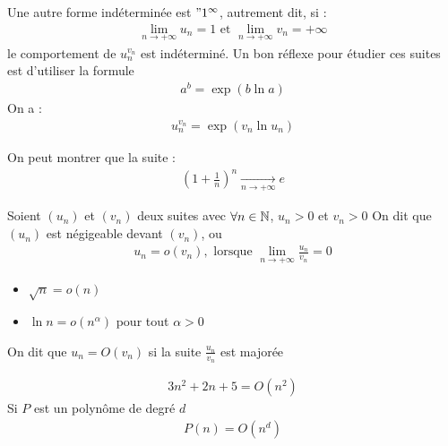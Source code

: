 \begin{remarque}
    Une autre forme indéterminée est $"1^{\infty}$, autrement dit, si :
    \begin{align*}
        \lim_{n \to +\infty} u_n = 1 \text{ et } \lim_{n \to +\infty} v_n = +\infty
    \end{align*}
    le comportement de $u_n^{v_n}$ est indéterminé. Un bon réflexe pour étudier ces suites est d'utiliser la formule 
    \begin{align*}
        a^b = \exp(b\ln a)
    \end{align*}
    On a :
    \begin{align*}
        u_n^{v_n} = \exp(v_n \ln u_n)
    \end{align*}
\end{remarque}

\begin{exemple}
On peut montrer que la suite :
\begin{align*} 
    \left(1 + \frac{1}{n}\right)^n \xrightarrow[n \to +\infty]{} e
\end{align*}
\end{exemple}

\begin{remarque}
Soient $(u_n)$ et $(v_n)$ deux suites avec $\forall n \in \mathbb{N}$, $u_n > 0$ et $v_n > 0$ On dit que $(u_n)$ est négigeable devant $(v_n)$, ou 
\begin{align*}
    u_n = o(v_n), \text{ lorsque } \lim_{n \to +\infty} \frac{u_n}{v_n} = 0
\end{align*}
\end{remarque}

\begin{exemple}
    \begin{itemize}
        \item $\sqrt{n} = o(n)$
        \item $\ln n = o(n^{\alpha})$ pour tout $\alpha > 0$
    \end{itemize}
\end{exemple}

\begin{remarque}
On dit que $u_n = O(v_n)$ si la suite $\frac{u_n}{v_n}$ est majorée
\end{remarque}

\begin{exemple}
    \begin{align*}
        3n^2 + 2n + 5 = O(n^2)
    \end{align*}
    Si $P$ est un polynôme de degré $d$
    \begin{align*}
        P(n) = O(n^d)
    \end{align*}
\end{exemple}


